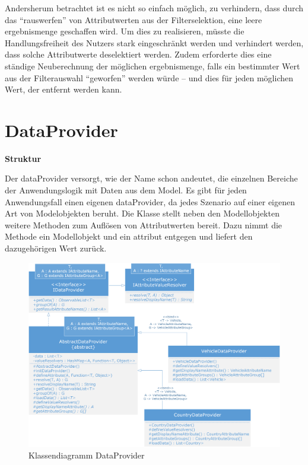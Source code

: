 Andersherum betrachtet ist es nicht so einfach möglich, zu verhindern, dass durch das \enquote{rauswerfen} von Attributwerten aus der Filterselektion, eine leere \gls{ergebnismenge} geschaffen wird. Um dies zu realisieren, müsste die Handlungsfreiheit des Nutzers stark eingeschränkt werden und verhindert werden, dass solche Attributwerte deselektiert werden. Zudem erforderte dies eine ständige Neuberechnung der möglichen \gls{ergebnismenge}, falls ein bestimmter Wert aus der Filterauswahl \enquote{geworfen} werden würde – und dies für jeden möglichen Wert, der entfernt werden kann.

\section{DataProvider} \label{sec:implDataProvider}
\textbf{Struktur}

Der \gls{dataProvider} versorgt, wie der Name schon andeutet, die einzelnen Bereiche der Anwendungslogik mit Daten aus dem Model. Es gibt für jeden Anwendungsfall einen eigenen \gls{dataProvider}, da jedes Szenario auf einer eigenen Art von Modelobjekten beruht. Die Klasse stellt neben den Modellobjekten weitere Methoden zum Auflösen von Attributwerten bereit. Dazu nimmt die Methode ein Modellobjekt und ein \gls{attribut} entgegen und liefert den dazugehörigen Wert zurück.

\begin{figure}[H]
 \centering
 \includegraphics[width=1\textwidth]{grafiken/Class_DataProvider.png}
 \caption{Klassendiagramm DataProvider}
 \label{fig:dataProvider1}
\end{figure}

